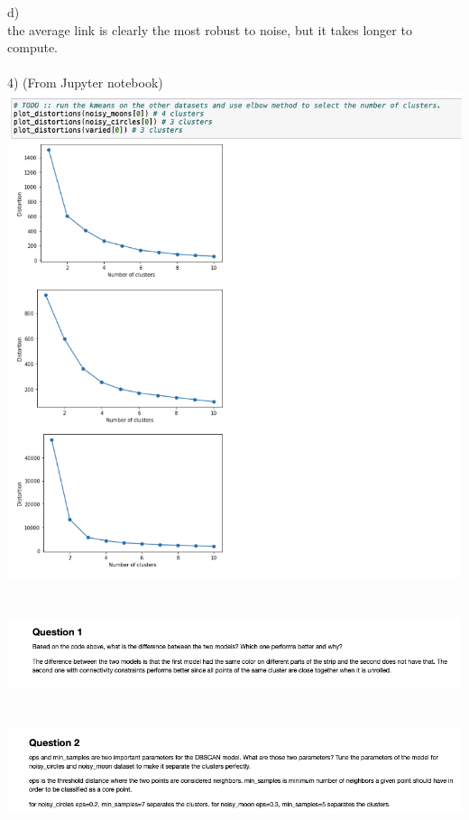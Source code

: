 \documentclass[11pt]{article}
\begin{document}
d) \\
the average link is clearly the most robust to noise, but it takes longer to compute. \\ \\

4) (From Jupyter notebook) \\
\includegraphics[scale=0.4]{img16} \\ \\ \\
\includegraphics[scale=0.4]{img17} \\ \\ \\
\includegraphics[scale=0.4]{img18} \\ \\ \\ \\ \\ \\ \\ \\ \\ \\ 
\end{document}
